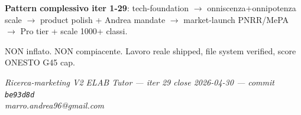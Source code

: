 \documentclass[12pt,a4paper]{article}
\begin{document}
\textbf{Pattern complessivo iter 1-29}: tech-foundation $\rightarrow$ onniscenza+onnipotenza scale $\rightarrow$ product polish + Andrea mandate $\rightarrow$ market-launch PNRR/MePA $\rightarrow$ Pro tier + scale 1000+ classi.

NON inflato. NON compiacente. Lavoro reale shipped, file system verified, score ONESTO G45 cap.

\vspace{1cm}

\begin{center}
\color{elabgray}\small\textit{Ricerca-marketing V2 ELAB Tutor --- iter 29 close 2026-04-30 --- commit \texttt{be93d8d}\\
marro.andrea96@gmail.com}
\end{center}
\end{document}
